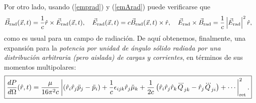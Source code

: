 Por otro lado, usando (\ref{emprad}) y (\ref{emArad}) puede verificarse que
\begin{equation}
 \vec{B}_{\rm rad}(\vec{x},t)=\frac{1}{c}\hat{r}\times\vec{E}_{\rm rad}(\vec{x},t), \quad  \vec{E}_{\rm rad}(\vec{x},t)=c\vec{B}_{\rm rad}(\vec{x},t)\times\hat{r}, \quad \vec{E}_{\rm rad}\times\vec{B}_{\rm rad}=\frac{1}{c}\left|\vec{E}_{\rm rad}\right|^2\hat{r},
\end{equation}
como es usual para un campo de radiación. De aquí obtenemos, finalmente, una expansión para la \textit{potencia por unidad de ángulo sólido radiada por una distribución arbitraria (pero aislada) de cargas y corrientes}, en términos de sus momentos multipolares:
\begin{equation}
 \boxed{\frac{dP}{d\Omega}(\hat{r},t)=\frac{\mu}{16\pi^2c} \left|\left(\hat{r}_i\hat{r}_j\ddot{p}_j-\ddot{p}_i\right)+\frac{1}{c}\epsilon_{ijk}\hat{r}_j\ddot{\mu}_k+\frac{1}{2c}\left(\hat{r}_i\hat{r}_j\hat{r}_k\dddot{Q}_{jk}-\hat{r}_j\dddot{Q}_{ji} \right)+\cdots\right|^2_{\rm ret}.}
\end{equation}


